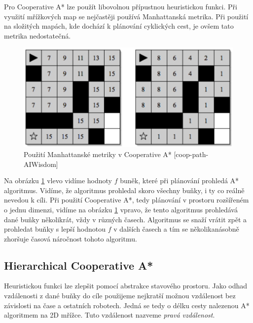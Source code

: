 Pro Cooperative A* lze použít libovolnou přípustnou heuristickou funkci. Při využití mřížkových map se nejčastěji používá Manhattanská metrika. Při použití na složitých mapách, kde dochází k plánování cyklických cest, je ovšem tato metrika nedostatečná.

\begin{figure}[!h]
	\begin{center}
		\includegraphics*[scale=0.5]{obr/coopManh}
	\end{center}
	\caption[caption]{Použití Manhattanské metriky v Cooperative A* [coop-path-AIWisdom]}
	\label{obr:coopManh}
\end{figure}

Na obrázku \ref{obr:coopManh} vlevo vidíme hodnoty $f$ buněk, které při plánování prohledá A* algoritmus. Vidíme, že algoritmus prohledal skoro všechny buňky, i ty co reálně nevedou k cíli. Při použití Cooperative A*, tedy plánování v prostoru rozšířeném o jednu dimenzi, vidíme na obrázku \ref{obr:coopManh} vpravo, že tento algoritmus prohledává dané buňky několikrát, vždy v různých časech. Algoritmus se snaží vrátit zpět a prohledat buňky s lepší hodnotou $f$ v dalších časech a tím se několikanásobně zhoršuje časová náročnost tohoto algoritmu.

\subsection{Hierarchical Cooperative A*}


Heuristickou funkci lze zlepšit pomocí abstrakce stavového prostoru.  Jako odhad vzdálenosti z dané buňky do cíle použijeme nejkratší možnou vzdálenost bez závislosti na čase a ostatních robotech. Jedná se tedy o délku cesty nalezenou A* algoritmem na 2D mřížce. Tuto vzdálenost nazveme \emph{pravá vzdálenost}.

